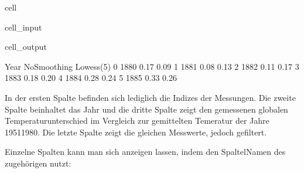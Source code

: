 \documentclass[letterpaper,10pt,english]{jupyterBook}
\begin{document}
\begin{sphinxuseclass}{cell}\begin{sphinxVerbatimInput}

\begin{sphinxuseclass}{cell_input}
\begin{sphinxVerbatim}[commandchars=\\\{\}]
 
\end{sphinxVerbatim}

\end{sphinxuseclass}\end{sphinxVerbatimInput}
\begin{sphinxVerbatimOutput}

\begin{sphinxuseclass}{cell_output}
\begin{sphinxVerbatim}[commandchars=\\\{\}]
   Year  No\PYGZus{}Smoothing  Lowess(5)
0  1880         \PYGZhy{}0.17      \PYGZhy{}0.09
1  1881         \PYGZhy{}0.08      \PYGZhy{}0.13
2  1882         \PYGZhy{}0.11      \PYGZhy{}0.17
3  1883         \PYGZhy{}0.18      \PYGZhy{}0.20
4  1884         \PYGZhy{}0.28      \PYGZhy{}0.24
5  1885         \PYGZhy{}0.33      \PYGZhy{}0.26
\end{sphinxVerbatim}

\end{sphinxuseclass}\end{sphinxVerbatimOutput}

\end{sphinxuseclass}
\sphinxAtStartPar
In der ersten Spalte befinden sich lediglich die Indizes der Messungen. Die zweite Spalte beinhaltet das Jahr und die dritte Spalte zeigt den gemessenen globalen Temperaturunterschied im Vergleich zur gemittelten Temeratur der Jahre 1951\sphinxhyphen{}1980. Die letzte Spalte zeigt die gleichen Messwerte, jedoch gefiltert.

\sphinxAtStartPar
Einzelne Spalten kann man sich anzeigen lassen, indem den Spaltel\sphinxhyphen{}Namen des zugehörigen  nutzt:
\end{document}
